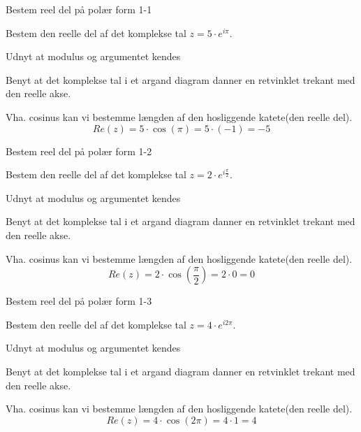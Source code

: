 \documentclass{article}
\begin{document}
\tableofcontents
\newpage

\begin{exercise}{Bestem reel del på polær form 1-1}

Bestem den reelle del af det komplekse tal $z=5 \cdot e^{i \pi}$.



\hint 

Udnyt at modulus og argumentet kendes


\hint

Benyt at det komplekse tal i et argand diagram danner en retvinklet trekant med den reelle akse. 

\hint 

Vha. cosinus kan vi bestemme længden af den hosliggende katete(den reelle del).
\[
Re(z) =  5 \cdot \cos(\pi) = 5 \cdot (-1) = -5 
\]

\end{exercise}

\newpage

\begin{exercise}{Bestem reel del på polær form 1-2}
	
	Bestem den reelle del af det komplekse tal $z=2 \cdot e^{i \frac{\pi}{2}}$.
	
	
	
	\hint 
	
	Udnyt at modulus og argumentet kendes
	
	
	\hint
	
	Benyt at det komplekse tal i et argand diagram danner en retvinklet trekant med den reelle akse. 
	
	\hint 
	
	Vha. cosinus kan vi bestemme længden af den hosliggende katete(den reelle del).
	\[
	Re(z) =  2 \cdot \cos\left(\frac{\pi}{2}\right) = 2 \cdot 0 = 0
	\]
	
\end{exercise}

\newpage

\begin{exercise}{Bestem reel del på polær form 1-3}
	
	Bestem den reelle del af det komplekse tal $z=4 \cdot e^{i 2\pi}$.
	
	
	
	\hint 
	
	Udnyt at modulus og argumentet kendes
	
	
	\hint
	
	Benyt at det komplekse tal i et argand diagram danner en retvinklet trekant med den reelle akse. 
	
	\hint 
	
	Vha. cosinus kan vi bestemme længden af den hosliggende katete(den reelle del).
	\[
	Re(z) =  4 \cdot \cos(2\pi) = 4 \cdot 1 = 4
	\]
	
\end{exercise}
\end{document}
